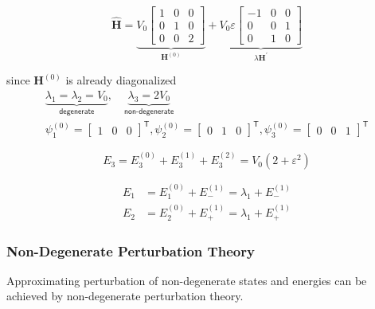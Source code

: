 \begin{examplesection}
    \noindent\begin{equation*}
        \widehat{\mathbf{H}} = \underbrace{V_0 
        \begin{bmatrix}
            1&0&0\\
            0&1&0\\
            0&0&2
        \end{bmatrix}}_{\mathbf{H}^(0)}
        + \underbrace{V_0 \varepsilon
        \begin{bmatrix}
            -1&0&0\\
            0&0&1\\
            0&1&0
        \end{bmatrix}}_{\lambda\mathbf{H}^{\prime}}
    \end{equation*}

    since $\mathbf{H}^{(0)}$ is already diagonalized
    \noindent\begin{gather*}
        \underbrace{\lambda_1 = \lambda_2 = V_0}_{\textsf{degenerate}},\quad \underbrace{\lambda_3 = 2V_0}_{\textsf{non-degenerate}}\\
        \psi_1^{(0)} = \begin{bmatrix}
            1&0&0
        \end{bmatrix}^{\mathsf{T}},
        \psi_2^{(0)} = \begin{bmatrix}
            0&1&0
        \end{bmatrix}^{\mathsf{T}},
        \psi_3^{(0)} = \begin{bmatrix}
            0&0&1
        \end{bmatrix}^{\mathsf{T}}
    \end{gather*}

    \newpar{}
    \noindent\begin{equation*}
        E_3 = E_3^{(0)}+E_3^{(1)}+E_3^{(2)} = V_0(2+\varepsilon^2)
    \end{equation*}

    \noindent\begin{align*}
            E_1 &= E_1^{(0)} + E_{-}^{(1)} = \lambda_1+ E_{-}^{(1)} \\
            E_2 &= E_2^{(0)} + E_{+}^{(1)} = \lambda_1+ E_{+}^{(1)}
    \end{align*}
\end{examplesection}

\subsubsection{Non-Degenerate Perturbation Theory}
Approximating perturbation of non-degenerate states and energies can be achieved by non-degenerate perturbation theory.
\newpar{}

